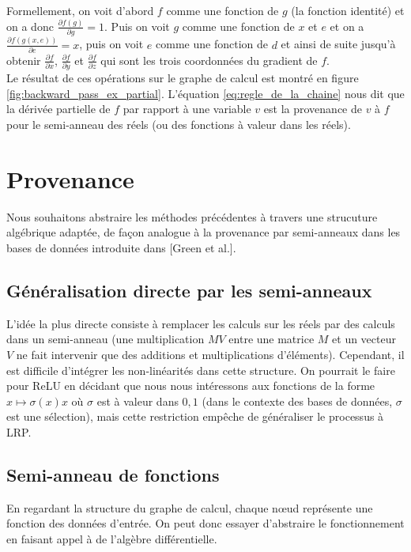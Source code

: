 \documentclass[11pt,a4paper]{article}
\begin{document}
	
	Formellement, on voit d'abord $f$ comme une fonction de $g$ (la fonction identité) et on a donc $\frac{\partial f(g)}{\partial g} = 1$. Puis on voit $g$ comme une fonction de $x$ et $e$ et on a $\frac{\partial f(g(x,e))}{\partial e}=x$, puis on voit $e$ comme une fonction de $d$ et ainsi de suite jusqu'à obtenir $\frac{\partial f}{\partial x}$, $\frac{\partial f}{\partial y}$ et $\frac{\partial f}{\partial z}$ qui sont les trois coordonnées du gradient de $f$.\\
	
	Le résultat de ces opérations sur le graphe de calcul est montré en figure \ref{fig:backward_pass_ex_partial}. L'équation \ref{eq:regle_de_la_chaine} nous dit que la dérivée partielle de $f$ par rapport à une variable $v$ est la provenance de $v$ à $f$ pour le semi-anneau des réels (ou des fonctions à valeur dans les réels).

\section{Provenance}

Nous souhaitons abstraire les méthodes précédentes à travers une strucuture algébrique adaptée, de façon analogue à la provenance par semi-anneaux dans les bases de données introduite dans [Green et al.].

	\subsection{Généralisation directe par les semi-anneaux}

	L'idée la plus directe consiste à remplacer les calculs sur les réels par des calculs dans un semi-anneau (une multiplication $M V$ entre une matrice $M$ et un vecteur $V$ ne fait intervenir que des additions et multiplications d'éléments). Cependant, il est difficile d'intégrer les non-linéarités dans cette structure. On pourrait le faire pour ReLU en décidant que nous nous intéressons aux fonctions de la forme $x \mapsto \sigma(x)x$ où $\sigma$ est à valeur dans $0,1$ (dans le contexte des bases de données, $\sigma$ est une sélection), mais cette restriction empêche de généraliser le processus à LRP.

	\subsection{Semi-anneau de fonctions}
	
	En regardant la structure du graphe de calcul, chaque n\oe ud représente une fonction des données d'entrée. On peut donc essayer d'abstraire le fonctionnement en faisant appel à de l'algèbre différentielle. 
	
\end{document}
